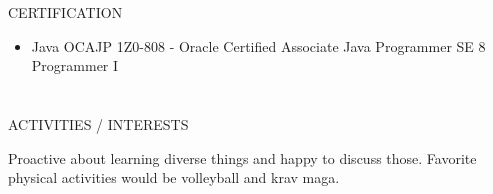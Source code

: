 \documentclass{my_cv}
\begin{document}
\begin{multicols}{2}
\section{\faStar}{CERTIFICATION}

\begin{itemize}[noitemsep]
    \item Java OCAJP 1Z0-808 - Oracle Certified Associate Java Programmer SE 8 Programmer I
\end{itemize}

\section{\faSoccerBallO}{ACTIVITIES / INTERESTS}

Proactive about learning diverse things and happy to discuss those. Favorite physical activities would be volleyball and krav maga.


\end{multicols}
\end{document}
